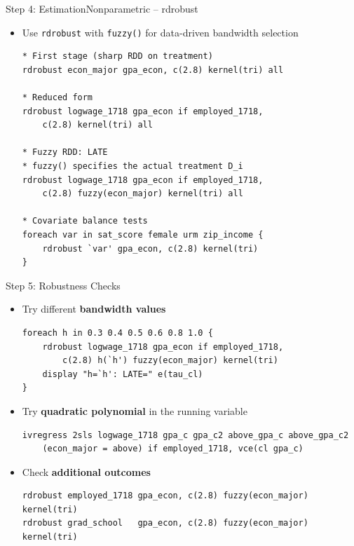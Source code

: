 \documentclass[hyperref={pdfpagelabels=false}]{beamer}
\begin{document}
\begin{frame}[fragile]{Step 4: Estimation}{Nonparametric -- rdrobust}
	\begin{itemize}
		\item Use \texttt{rdrobust} with \texttt{fuzzy()} for data-driven bandwidth selection
\begin{lstlisting}
* First stage (sharp RDD on treatment)
rdrobust econ_major gpa_econ, c(2.8) kernel(tri) all

* Reduced form
rdrobust logwage_1718 gpa_econ if employed_1718,
    c(2.8) kernel(tri) all

* Fuzzy RDD: LATE
* fuzzy() specifies the actual treatment D_i
rdrobust logwage_1718 gpa_econ if employed_1718,
    c(2.8) fuzzy(econ_major) kernel(tri) all

* Covariate balance tests
foreach var in sat_score female urm zip_income {
    rdrobust `var' gpa_econ, c(2.8) kernel(tri)
}
\end{lstlisting}
	\end{itemize}
\end{frame}



\begin{frame}[fragile]{Step 5: Robustness Checks}
	\begin{itemize}
		\item Try different \textbf{bandwidth values}
\begin{lstlisting}
foreach h in 0.3 0.4 0.5 0.6 0.8 1.0 {
    rdrobust logwage_1718 gpa_econ if employed_1718,
        c(2.8) h(`h') fuzzy(econ_major) kernel(tri)
    display "h=`h': LATE=" e(tau_cl)
}
\end{lstlisting}
		\vspace{0.1cm}
		\item Try \textbf{quadratic polynomial} in the running variable
\begin{lstlisting}
ivregress 2sls logwage_1718 gpa_c gpa_c2 above_gpa_c above_gpa_c2
    (econ_major = above) if employed_1718, vce(cl gpa_c)
\end{lstlisting}
		\vspace{0.1cm}
		\item Check \textbf{additional outcomes}
\begin{lstlisting}
rdrobust employed_1718 gpa_econ, c(2.8) fuzzy(econ_major) kernel(tri)
rdrobust grad_school   gpa_econ, c(2.8) fuzzy(econ_major) kernel(tri)
\end{lstlisting}
	\end{itemize}
\end{frame}
\end{document}
